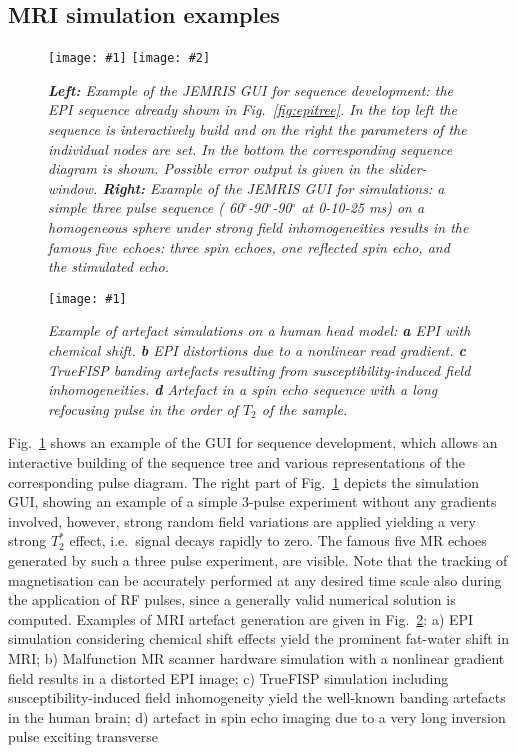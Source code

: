 \documentclass{nic-series}
\newcommand{\epsfigure}[5]{
 \begin{figure}[#4!]
   \begin{center}
    \texttt{[image: \#1]}
    \caption{{\sl #2}\label{#3}}
   \end{center}
 \end{figure}}
\newcommand{\epsfigures}[6]{
 \begin{figure}[#5!]
   \begin{center}
    \texttt{[image: \#1]}
    \hspace*{0.2cm}
    \texttt{[image: \#2]}
    \caption{{\sl #3}\label{#4}}
   \end{center}
 \end{figure}}
\begin{document}
\subsection{MRI simulation examples}
\epsfigures{fig/GUI_seq_ex1.eps}{fig/GUI_sim_ex1.eps}{{\bf Left:}  Example of the JEMRIS GUI for sequence development: the EPI sequence
			     already shown in Fig.~\ref{fig:epitree}. In the top left the sequence is interactively build and on the right
			     the parameters of the individual nodes are set. In the bottom the corresponding sequence
			     diagram is shown. Possible error output is given in the slider-window.
                             {\bf Right:} Example of the JEMRIS GUI for simulations: a simple three pulse sequence
			     ( 60$^\circ$-90$^\circ$-90$^\circ$ at 0-10-25 ms) on a homogeneous sphere under strong field inhomogeneities
			     results in the famous five echoes: three spin echoes, one reflected spin echo, and the stimulated
			     echo.}{fig:gui}{tp}{0.45}
\epsfigure{fig/simartex.eps}{Example of artefact simulations on a human head model: {\bf a} EPI with chemical shift.
                               {\bf b} EPI distortions due to a nonlinear read gradient. {\bf c} TrueFISP banding artefacts
				resulting from susceptibility-induced field inhomogeneities. {\bf d} Artefact in a spin echo
				sequence with a long refocusing pulse in the order of $T_2$ of the
				sample.}{fig:artifacts}{tp}{1.0}
Fig.~\ref{fig:gui} shows an example of the GUI for sequence development, which allows an interactive
building of the sequence tree and various representations of the corresponding pulse diagram. The right part of Fig.~\ref{fig:gui}
depicts the simulation GUI, showing an example of a simple 3-pulse experiment without any gradients involved, however, strong
random field variations are applied yielding a very strong $T_{2}^{*}$ effect, i.e.~signal decays rapidly to zero. The
famous five MR echoes generated by such a three pulse experiment, are visible. Note that the tracking of magnetisation can be accurately
performed at any desired time scale also during the application of RF pulses, since a generally valid numerical solution is computed.
Examples of MRI artefact generation are given in Fig.~\ref{fig:artifacts}: a) EPI simulation considering chemical shift effects
yield the prominent fat-water shift in MRI; b) Malfunction MR scanner hardware simulation with a nonlinear gradient field results
in a distorted EPI image; c) TrueFISP simulation including susceptibility-induced field inhomogeneity yield the well-known
banding artefacts in the human brain; d) artefact in spin echo imaging due to a very long inversion pulse exciting transverse
\end{document}

